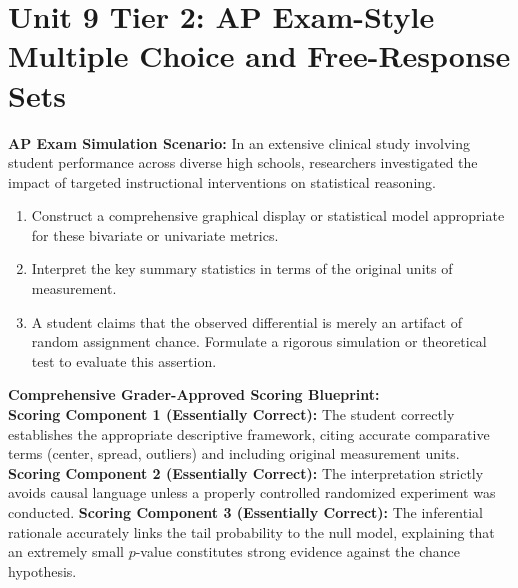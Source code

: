 \section{Unit 9 Tier 2: AP Exam-Style Multiple Choice and Free-Response Sets}
\begin{workbookbox}
\textbf{AP Exam Simulation Scenario:} In an extensive clinical study involving student performance across diverse high schools, researchers investigated the impact of targeted instructional interventions on statistical reasoning.
\begin{enumerate}[label=(\alph*)]
  \item Construct a comprehensive graphical display or statistical model appropriate for these bivariate or univariate metrics.
  \item Interpret the key summary statistics in terms of the original units of measurement.
  \item A student claims that the observed differential is merely an artifact of random assignment chance. Formulate a rigorous simulation or theoretical test to evaluate this assertion.
\end{enumerate}
\textbf{Comprehensive Grader-Approved Scoring Blueprint:}\\
\textbf{Scoring Component 1 (Essentially Correct):} The student correctly establishes the appropriate descriptive framework, citing accurate comparative terms (center, spread, outliers) and including original measurement units.
\textbf{Scoring Component 2 (Essentially Correct):} The interpretation strictly avoids causal language unless a properly controlled randomized experiment was conducted.
\textbf{Scoring Component 3 (Essentially Correct):} The inferential rationale accurately links the tail probability to the null model, explaining that an extremely small $p$-value constitutes strong evidence against the chance hypothesis.
\end{workbookbox}\vspace{6pt}
